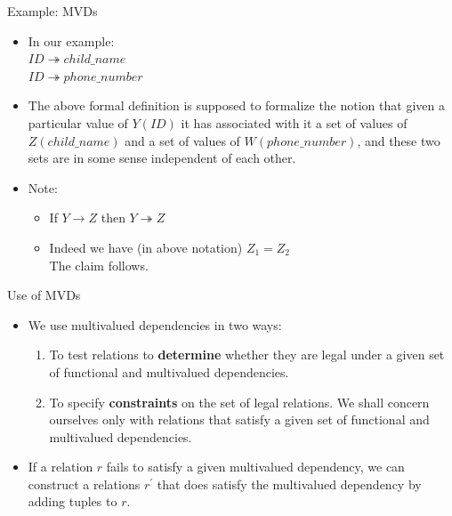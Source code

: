 \documentclass{beamer}
\begin{document}
\begin{frame}{Example: MVDs}
    \begin{itemize}
        \item In our example: \\
            \quad $ID \twoheadrightarrow child\_name$ \\
            \quad $ID \twoheadrightarrow phone\_number$ \\

        \item The above formal definition is supposed to formalize the notion that given a particular value of $Y(ID)$ it has associated with it a set of values of $Z(child\_name)$ and a set of values of $W(phone\_number)$, and these two sets are in some sense independent of each other.

        \item Note:
            \begin{itemize}
                \item If $Y \rightarrow Z$ then $Y \twoheadrightarrow Z$
                \item Indeed we have (in above notation) $Z_1 = Z_2$ \\
                    The claim follows.
            \end{itemize}
    \end{itemize}
\end{frame}

\begin{frame}{Use of MVDs}
    \begin{itemize}
        \item We use multivalued dependencies in two ways:
            \begin{enumerate}
                \item To test relations to \textbf{determine} whether they are legal under a given set of functional and multivalued dependencies.
                \item To specify \textbf{constraints} on the set of legal relations. We shall concern ourselves only with relations that satisfy a given set of functional and multivalued dependencies.
            \end{enumerate}

        \item If a relation $r$ fails to satisfy a given multivalued dependency, we can construct a relations $r^\prime$ that does satisfy the multivalued dependency by adding tuples to $r$.
    \end{itemize}
\end{frame}
\end{document}
